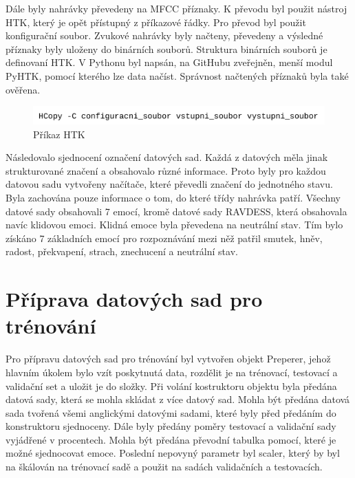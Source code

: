 \documentclass[FM,BP]{tulthesis}
\begin{document}
Dále byly nahrávky převedeny na MFCC příznaky. K převodu byl použit nástroj HTK, který je opět přístupný z příkazové řádky. Pro převod byl použit konfigurační soubor. Zvukové nahrávky byly načteny, převedeny a výsledné příznaky byly uloženy do binárních souborů. Struktura binárních souborů je definovaní HTK. V Pythonu byl napsán, na GitHubu zveřejněn, menší modul PyHTK, pomocí kterého lze data načíst. Správnost načtených příznaků byla také ověřena.

\begin{figure}[htbp]
\centerline{\includegraphics[width=\textwidth,height=\textheight,keepaspectratio]{htk_command.png}}
\caption{Příkaz HTK}
\label{fig}
\end{figure}

Následovalo sjednocení označení datových sad. Každá z datových měla jinak strukturované značení a obsahovalo různé informace. Proto byly pro každou datovou sadu vytvořeny načítače, které převedli značení do jednotného stavu. Byla zachována pouze informace o tom, do které třídy nahrávka patří. Všechny datové sady obsahovali 7 emocí, kromě datové sady RAVDESS, která obsahovala navíc klidovou emoci. Klidná emoce byla převedena na neutrální stav. Tím bylo získáno 7 základních emocí pro rozpoznávání mezi něž patřil smutek, hněv, radost, překvapení, strach, znechucení a neutrální stav.

\section{Příprava datových sad pro trénování}

Pro přípravu datových sad pro trénování byl vytvořen objekt Preperer, jehož hlavním úkolem bylo vzít poskytnutá data, rozdělit je na trénovací, testovací a validační set a uložit je do složky. Při volání kostruktoru objektu byla předána datová sady, která se mohla skládat z více datový sad. Mohla být předána datová sada tvořená všemi anglickými datovými sadami, které byly před předáním do konstruktoru sjednoceny. Dále byly předány poměry testovací a validační sady vyjádřené v procentech. Mohla být předána převodní tabulka pomocí, které je možné sjednocovat emoce. Poslední nepovyný parametr byl scaler, který by byl na škálován na trénovací sadě a použit na sadách validačních a testovacích.
\end{document}
